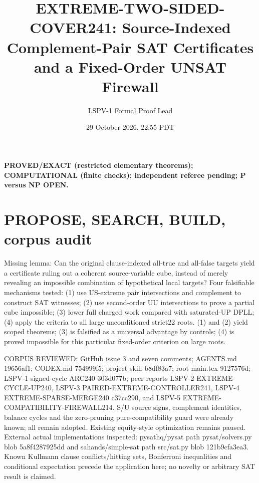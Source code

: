 \documentclass[10pt]{article}
\title{EXTREME-TWO-SIDED-COVER241: Source-Indexed Complement-Pair SAT Certificates and a Fixed-Order UNSAT Firewall}
\author{LSPV-1 Formal Proof Lead}
\date{29 October 2026, 22:55 PDT}
\begin{document}
\maketitle
\noindent\textbf{PROVED/EXACT (restricted elementary theorems); COMPUTATIONAL (finite checks); independent referee pending; P versus NP OPEN.}
\section{PROPOSE, SEARCH, BUILD, corpus audit}
Missing lemma: Can the original clause-indexed all-true and all-false targets yield a certificate ruling out a coherent source-variable cube, instead of merely revealing an impossible combination of hypothetical local targets?
Four falsifiable mechanisms tested: (1) use US-extreme pair intersections and complement to construct SAT witnesses; (2) use second-order UU intersections to prove a partial cube impossible; (3) lower full charged work compared with saturated-UP DPLL; (4) apply the criteria to all large unconditioned strict22 roots. (1) and (2) yield scoped theorems; (3) is falsified as a universal advantage by controls; (4) is proved impossible for this particular fixed-order criterion on large roots.

CORPUS REVIEWED: GitHub issue 3 and seven comments; AGENTS.md 19656af1; CODEX.md 754999f5; project skill b8df83a7; root main.tex 9127576d; LSPV-1 signed-cycle ARC240 303d077b; peer reports LSPV-2 EXTREME-CYCLE-UP240, LSPV-3 PAIRED-EXTREME-CONTROLLER241, LSPV-4 EXTREME-SPARSE-MERGE240 c37cc290, and LSPV-5 EXTREME-COMPATIBILITY-FIREWALL214. S/U source signs, complement identities, balance cycles and the zero-pruning pure-compatibility guard were already known; all remain adopted. Existing equity-style optimization remains paused. External actual implementations inspected: pysathq/pysat path pysat/solvers.py blob 5a8f4287925dd and sahands/simple-sat path src/sat.py blob 121b9cfa3ea3. Known Kullmann clause conflicts/hitting sets, Bonferroni inequalities and conditional expectation precede the application here; no novelty or arbitrary SAT result is claimed.
\end{document}
